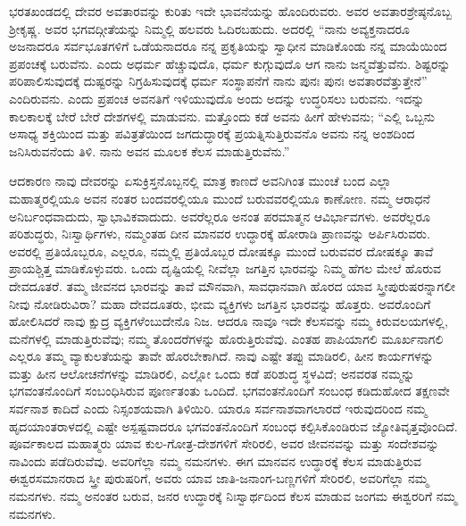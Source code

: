 ಭರತಖಂಡದಲ್ಲಿ ದೇವರ ಅವತಾರವನ್ನು ಕುರಿತು ಇದೇ ಭಾವನೆಯನ್ನು ಹೊಂದಿರುವರು. ಅವರ ಅವತಾರಶ್ರೇಷ್ಠನೊಬ್ಬ ಶ‍್ರೀಕೃಷ್ಣ. ಅವರ ಭಗವದ್ಗೀತೆಯನ್ನು ನಿಮ್ಮಲ್ಲಿ ಹಲವರು ಓದಿರಬಹುದು. ಅದರಲ್ಲಿ “ನಾನು ಅವ್ಯಕ್ತನಾದರೂ ಅಜನಾದರೂ ಸರ್ವಭೂತಗಳಿಗೆ ಒಡೆಯನಾದರೂ ನನ್ನ ಪ್ರಕೃತಿಯನ್ನು ಸ್ವಾಧೀನ ಮಾಡಿಕೊಂಡು ನನ್ನ ಮಾಯೆಯಿಂದ ಪ್ರಪಂಚಕ್ಕೆ ಬರುವೆನು. ಎಂದು ಅಧರ್ಮ ಹೆಚ್ಚುವುದೊ, ಧರ್ಮ ಕುಗ್ಗುವುದೊ ಆಗ ನಾನು ಜನ್ಮವೆತ್ತುವೆನು. ಶಿಷ್ಟರನ್ನು ಪರಿಪಾಲಿಸುವುದಕ್ಕೆ ದುಷ್ಟರನ್ನು ನಿಗ್ರಹಿಸುವುದಕ್ಕೆ ಧರ್ಮ ಸಂಸ್ಥಾಪನೆಗೆ ನಾನು ಪುನಃ ಪುನಃ ಅವತಾರವೆತ್ತುತ್ತೇನೆ” ಎಂದಿರುವನು. ಎಂದು ಪ್ರಪಂಚ ಅವನತಿಗೆ ಇಳಿಯುವುದೊ ಅಂದು ಅದನ್ನು ಉದ್ಧರಿಸಲು ಬರುವನು. ಇದನ್ನು ಕಾಲಕಾಲಕ್ಕೆ ಬೇರೆ ಬೇರೆ ದೇಶಗಳಲ್ಲಿ ಮಾಡುವನು. ಮತ್ತೊಂದು ಕಡೆ ಅವನು ಹೀಗೆ ಹೇಳುವನು; “ಎಲ್ಲಿ ಒಬ್ಬನು ಅಸಾಧ್ಯ ಶಕ್ತಿಯಿಂದ ಮತ್ತು ಪವಿತ್ರತೆಯಿಂದ ಜಗದುದ್ಧಾರಕ್ಕೆ ಪ್ರಯತ್ನಿಸುತ್ತಿರುವನೊ ಅವನು ನನ್ನ ಅಂಶದಿಂದ ಜನಿಸಿರುವನೆಂದು ತಿಳಿ. ನಾನು ಅವನ ಮೂಲಕ ಕೆಲಸ ಮಾಡುತ್ತಿರುವೆನು.”

ಆದಕಾರಣ ನಾವು ದೇವರನ್ನು ಏಸುಕ್ರಿಸ್ತನೊಬ್ಬನಲ್ಲಿ ಮಾತ್ರ ಕಾಣದೆ ಅವನಿಗಿಂತ ಮುಂಚೆ ಬಂದ ಎಲ್ಲಾ ಮಹಾತ್ಮರಲ್ಲಿಯೂ ಅವನ ನಂತರ ಬಂದವರಲ್ಲಿಯೂ ಮುಂದೆ ಬರುವವರಲ್ಲಿಯೂ ಕಾಣೋಣ. ನಮ್ಮ ಆರಾಧನೆ ಅನಿರ್ಬಂಧವಾದುದು, ಸ್ವಾಭಾವಿಕವಾ\-ದುದು. ಅವರೆಲ್ಲರೂ ಅನಂತ ಪರಮಾತ್ಮನ ಆವಿರ್ಭಾವಗಳು. ಅವರೆಲ್ಲರೂ ಪರಿಶುದ್ಧರು, ನಿಃಸ್ವಾರ್ಥಿಗಳು, ನಮ್ಮಂತಹ ದೀನ ಮಾನವರ ಉದ್ಧಾರಕ್ಕೆ ಹೋರಾಡಿ ಪ್ರಾಣವನ್ನು ಅರ್ಪಿಸಿ\break ರುವರು. ಅವರಲ್ಲಿ ಪ್ರತಿಯೊಬ್ಬರೂ, ಎಲ್ಲರೂ, ನಮ್ಮಲ್ಲಿ ಪ್ರತಿಯೊಬ್ಬರ ದೋಷಕ್ಕೂ ಮುಂದೆ ಬರುವವರ ದೋಷಕ್ಕೂ ತಾವೆ ಪ್ರಾಯಶ್ಚಿತ್ತ ಮಾಡಿಕೊಳ್ಳುವರು. ಒಂದು ದೃಷ್ಟಿಯಲ್ಲಿ ನೀವೆಲ್ಲಾ ಜಗತ್ತಿನ ಭಾರವನ್ನು ನಿಮ್ಮ ಹೆಗಲ ಮೇಲೆ ಹೊರುವ ದೇವದೂತರೆ. ತಮ್ಮ ಜೀವನದ ಭಾರವನ್ನು ತಾವೆ ಮೌನವಾಗಿ, ಸಾವಧಾನವಾಗಿ ಹೊರದ ಯಾವ ಸ್ತ್ರೀ\-ಪುರುಷರನ್ನಾಗಲೀ ನೀವು ನೋಡಿರುವಿರಾ? ಮಹಾ ದೇವದೂತರು, ಭೀಮ ವ್ಯಕ್ತಿಗಳು ಜಗ\break ತ್ತಿನ ಭಾರವನ್ನು ಹೊತ್ತರು. ಅವರೊಂದಿಗೆ ಹೋಲಿಸಿದರೆ ನಾವು ಕ್ಷುದ್ರ ವ್ಯಕ್ತಿಗಳೆಂಬುದೇನೊ ನಿಜ. ಆದರೂ ನಾವೂ ಇದೇ ಕೆಲಸವನ್ನು ನಮ್ಮ ಕಿರುವಲಯಗಳಲ್ಲಿ, ಮನೆಗಳಲ್ಲಿ ಮಾಡುತ್ತಿ\break ರುವೆವು; ನಮ್ಮ ತೊಂದರೆಗಳನ್ನು ಹೊರುತ್ತಿರುವೆವು. ಎಂತಹ ಪಾಪಿಯಾಗಲಿ ಮೂರ್ಖನಾ\break ಗಲಿ ಎಲ್ಲರೂ ತಮ್ಮ ವ್ಯಾಕುಲತೆಯನ್ನು ತಾವೇ ಹೊರಬೇಕಾಗಿದೆ. ನಾವು ಎಷ್ಟೇ ತಪ್ಪು ಮಾಡಿರಲಿ, ಹೀನ ಕಾರ್ಯಗಳನ್ನು ಮತ್ತು ಹೀನ ಆಲೋಚನೆಗಳನ್ನು ಮಾಡಿರಲಿ, ಎಲ್ಲೋ ಒಂದು ಕಡೆ ಪರಿಶುದ್ಧ ಸ್ಥಳವಿದೆ; ಅನವರತ ನಮ್ಮನ್ನು ಭಗವಂತ\-ನೊಂದಿಗೆ ಸಂಬಂಧಿಸಿರುವ ಪೂರ್ಣತಂತು ಒಂದಿದೆ. ಭಗವಂತನೊಂದಿಗೆ ಸಂಬಂಧ ಕಡಿದುಹೋದ ತಕ್ಷಣವೇ ಸರ್ವನಾಶ ಕಾದಿದೆ ಎಂದು ನಿಸ್ಸಂಶಯವಾಗಿ ತಿಳಿಯಿರಿ. ಯಾರೂ ಸರ್ವನಾಶವಾಗಲಾರದೆ ಇರುವುದರಿಂದ ನಮ್ಮ ಹೃದಯಾಂತರಾಳದಲ್ಲಿ ಎಷ್ಟೇ ಅಸ್ಪಷ್ಟವಾದರೂ ಭಗವಂತನೊಂದಿಗೆ ಸಂಬಂಧ ಕಲ್ಪಿಸಿಕೊಂಡಿರುವ ಜ್ಯೋತಿವೃತ್ತವೊಂದಿದೆ. ಪೂರ್ವಕಾಲದ ಮಹಾತ್ಮರು ಯಾವ ಕುಲ-ಗೋತ್ರ-ದೇಶಗಳಿಗೆ ಸೇರಿರಲಿ, ಅವರ ಜೀವನವನ್ನು ಮತ್ತು ಸಂದೇಶವನ್ನು ನಾವಿಂದು ಪಡೆದಿರುವೆವು. ಅವರಿಗೆಲ್ಲಾ ನಮ್ಮ ನಮನಗಳು. ಈಗ ಮಾನವನ ಉದ್ಧಾರಕ್ಕೆ ಕೆಲಸ ಮಾಡುತ್ತಿರುವ ಈಶ್ವರಸಮಾನರಾದ ಸ್ತ್ರೀ ಪುರುಷರಿಗೆ, ಅವರು ಯಾವ ಜಾತಿ-ಜನಾಂಗ-ಬಣ್ಣಗಳಿಗೆ ಸೇರಿರಲಿ, ಅವರಿಗೆಲ್ಲಾ ನಮ್ಮ ನಮನಗಳು. ನಮ್ಮ ಅನಂತರ ಬರುವ, ಜನರ ಉದ್ಧಾರಕ್ಕೆ ನಿಃಸ್ವಾರ್ಥದಿಂದ ಕೆಲಸ ಮಾಡುವ ಜಂಗಮ ಈಶ್ವರರಿಗೆ ನಮ್ಮ ನಮನಗಳು.

